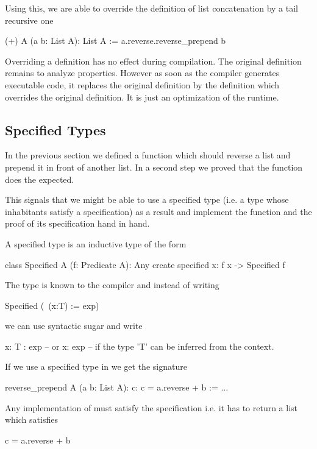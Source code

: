 Using this, we are able to override the definition of list concatenation by a
tail recursive one

\begin{alba}
  (+) A (a b: List A): List A :=
    a.reverse.reverse_prepend b
\end{alba}

Overriding a definition has no effect during compilation. The original
definition remains to analyze properties. However as soon as the compiler
generates executable code, it replaces the original definition by the
definition which overrides the original definition. It is just an optimization
of the runtime.





\subsection{Specified Types}

In the previous section we defined a function  which
should reverse a list and prepend it in front of another list. In a second
step we proved that the function does the expected.

This signals that we might be able to use a specified type (i.e. a type whose
inhabitants satisfy a specification) as a result and implement the function
and the proof of its specification hand in hand.

A specified type is an inductive type of the form
%
\begin{alba}
   class Specified A (f: Predicate A): Any create
     specified x: f x -> Specified f
\end{alba}

The type  is known to the compiler and instead of writing
%
\begin{alba}
  Specified (\ (x:T) := exp)
\end{alba}
%
we can use syntactic sugar and write
%
\begin{alba}
  {x: T : exp}
  -- or
  {x: exp}     -- if the type 'T' can be inferred from the context.
\end{alba}


If we use a specified type in  we get the signature
\begin{alba}
  reverse_prepend A (a b: List A): {c: c = a.reverse + b} :=
    ...
\end{alba}

Any implementation of  must satisfy the specification
i.e. it has to return a list  which satisfies
\begin{alba}
  c = a.reverse + b
\end{alba}



